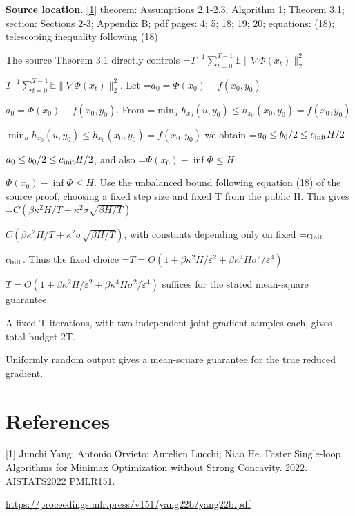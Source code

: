 \documentclass[10pt,a4paper]{article}
\newcommand{\AtlasMath}[1]{\par\begingroup\centering\setbox0=\hbox{$\displaystyle #1$}\ifdim\wd0>1.4\linewidth\typeout{ATLAS WIDE FORMULA: \the\wd0}\fi\ifdim\wd0>\linewidth\resizebox{\linewidth}{!}{\box0}\else\box0\fi\par\endgroup}
\newcommand{\AtlasInlineMath}[1]{\begingroup\setbox0=\hbox{$#1$}\ifdim\wd0>.4\linewidth\endgroup\AtlasMath{#1}\else\endgroup$#1$\fi}
\begin{document}
\textbf{Source location.} \href{https://proceedings.mlr.press/v151/yang22b/yang22b.pdf}{[1]} theorem: Assumptions 2.1-2.3; Algorithm 1; Theorem 3.1; section: Sections 2-3; Appendix B; pdf pages: 4; 5; 18; 19; 20; equations: (18); telescoping inequality following (18)

The source Theorem 3.1 directly controls \AtlasInlineMath{T^{-1}\sum_{t=0}^{T-1}\mathbb E\|\nabla\Phi(x_t)\|_2^2}. Let \AtlasInlineMath{a_0=\Phi(x_0)-f(x_0,y_0)}. From \AtlasInlineMath{\min_u h_{x_0}(u,y_0)\le h_{x_0}(x_0,y_0)=f(x_0,y_0)} we obtain \AtlasInlineMath{a_0\le b_0/2\le c_{\rm init}H/2}, and also \AtlasInlineMath{\Phi(x_0)-\inf\Phi\le H}. Use the unbalanced bound following equation (18) of the source proof, choosing a fixed step size and fixed T from the public H. This gives \AtlasInlineMath{C(\beta\kappa^2H/T+\kappa^2\sigma\sqrt{\beta H/T})}, with constants depending only on fixed \AtlasInlineMath{c_{\rm init}}. Thus the fixed choice \AtlasInlineMath{T=O(1+\beta\kappa^2H/\varepsilon^2+\beta\kappa^4H\sigma^2/\varepsilon^4)} suffices for the stated mean-square guarantee.

A fixed T iterations, with two independent joint-gradient samples each, gives total budget 2T.

Uniformly random output gives a mean-square guarantee for the true reduced gradient.

\section{References}
[1] Junchi Yang; Antonio Orvieto; Aurelien Lucchi; Niao He. Faster Single-loop Algorithms for Minimax Optimization without Strong Concavity. 2022. AISTATS2022 PMLR151.

\url{https://proceedings.mlr.press/v151/yang22b/yang22b.pdf}
\end{document}
